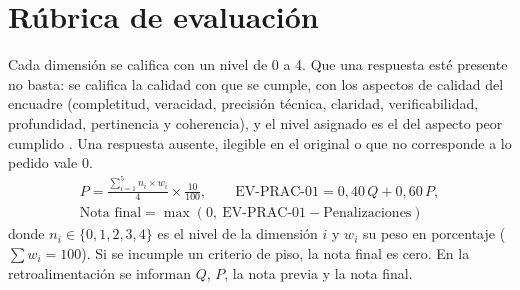 \documentclass[11pt]{article}
\newcommand{\seccion}[1]{\section{\textcolor{utegreendk}{#1}}}
\begin{document}
	\seccion{Rúbrica de evaluación}
	
	Cada dimensión se califica con un nivel de 0 a 4. Que una respuesta esté presente no basta: se califica la calidad con que se cumple, con los aspectos de calidad del encuadre (completitud, veracidad, precisión técnica, claridad, verificabilidad, profundidad, pertinencia y coherencia), y el nivel asignado es el del aspecto peor cumplido \citep{brookhart_2018,panadero_jonsson_2020}. Una respuesta ausente, ilegible en el original o que no corresponde a lo pedido vale 0.
	\begin{gather*}
		P = \frac{\sum_{i=1}^{5} n_i \times w_i}{4} \times \frac{10}{100}, \qquad \text{EV-PRAC-01} = 0{,}40\,Q + 0{,}60\,P,\\
		\text{Nota final} = \max(0,\ \text{EV-PRAC-01} - \text{Penalizaciones})
	\end{gather*}
	donde $n_i \in \{0,1,2,3,4\}$ es el nivel de la dimensión $i$ y $w_i$ su peso en porcentaje ($\sum w_i = 100$). Si se incumple un criterio de piso, la nota final es cero. En la retroalimentación se informan $Q$, $P$, la nota previa y la nota final.
	
\end{document}
